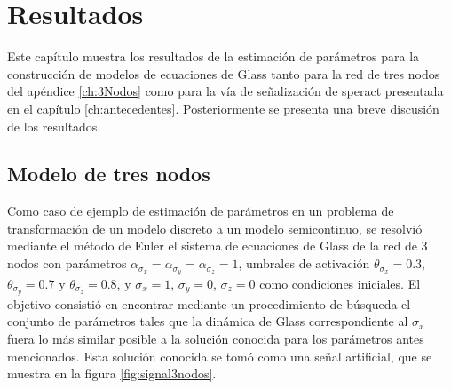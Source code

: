 \chapter{Resultados}\label{ch:resultados}

Este capítulo muestra los resultados de la estimación de parámetros para la construcción de modelos de ecuaciones de Glass tanto para la red de tres nodos del apéndice \ref{ch:3Nodos} como para la vía de señalización de speract presentada en el capítulo \ref{ch:antecedentes}. Posteriormente se presenta una breve discusión de los resultados.


\section{Modelo de tres nodos}

Como caso de ejemplo de estimación de parámetros en un problema de transformación de un modelo discreto a un modelo semicontinuo, se resolvió mediante el método de Euler el sistema de ecuaciones de Glass de la red de 3 nodos con parámetros $\alpha_{\sigma_x} = \alpha_{\sigma_y} =  \alpha_{\sigma_z} = 1$, umbrales de activación $\theta_{\sigma_x} = 0.3$, $\theta_{\sigma_y} = 0.7$ y $\theta_{\sigma_z} = 0.8$, y $\sigma_x = 1$, $\sigma_y = 0$, $\sigma_z = 0$ como condiciones iniciales. El objetivo consistió en encontrar mediante un procedimiento de búsqueda el conjunto de parámetros tales que la dinámica de Glass correspondiente al $\sigma_x$ fuera lo más similar posible a la solución conocida para los parámetros antes mencionados. Esta solución conocida se tomó como una señal artificial, que se muestra en la figura \ref{fig:signal3nodos}.

